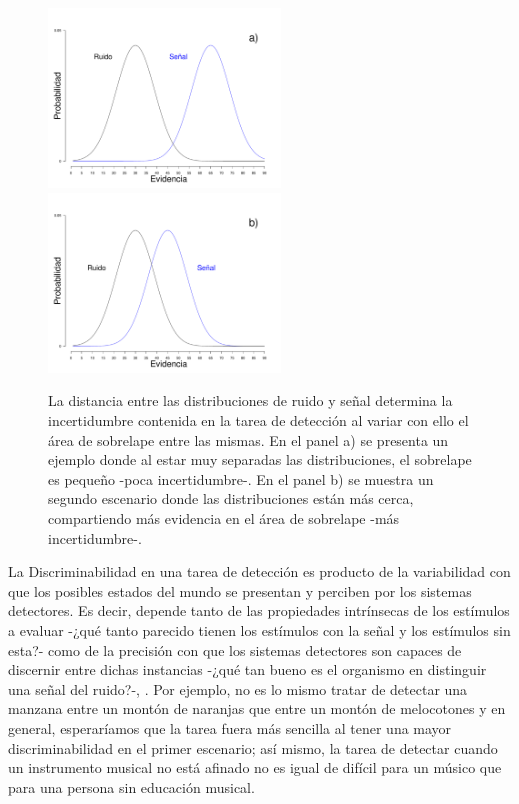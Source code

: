 \begin{figure}[th]
\centering
\includegraphics[width=0.55\textwidth]{Figures/Overlap_Small}\\ 
\includegraphics[width=0.55\textwidth]{Figures/Overlap_Big} 
\caption[El sobrelape Ruido-señal como reflejo de la incertidumbre contenida en tareas de detección]{La distancia entre las distribuciones de ruido y señal determina la incertidumbre contenida en la tarea de detección al variar con ello el área de sobrelape entre las mismas. En el panel a) se presenta un ejemplo donde al estar muy separadas las distribuciones, el sobrelape es pequeño -poca incertidumbre-. En el panel b) se muestra un segundo escenario donde las distribuciones están más cerca, compartiendo más evidencia en el área de sobrelape -más incertidumbre-.}
\label{fig:Overlap}
\end{figure}

La Discriminabilidad en una tarea de detección es producto de la variabilidad con que los posibles estados del mundo se presentan y perciben por los sistemas detectores. Es decir, depende tanto de las propiedades intrínsecas de los estímulos a evaluar -¿qué tanto parecido tienen los estímulos con la señal y los estímulos sin esta?- como de la precisión con que los sistemas detectores son capaces de discernir entre dichas instancias -¿qué tan bueno es el organismo en distinguir una señal del ruido?-, \parencite{Nevin1969}. Por ejemplo, no es lo mismo tratar de detectar una manzana entre un montón de naranjas que entre un montón de melocotones y en general, esperaríamos que la tarea fuera más sencilla al tener una mayor discriminabilidad en el primer escenario; así mismo, la tarea de detectar cuando un instrumento musical no está afinado no es igual de difícil para un músico que para una persona sin educación musical.\\

